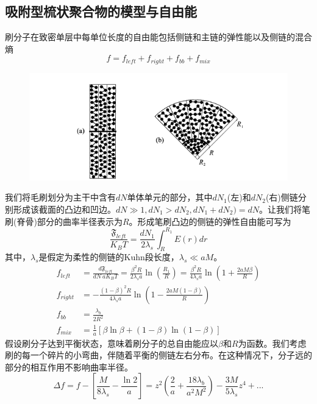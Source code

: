 \documentclass[12pt,a4paper]{article}
\numberwithin{equation}{section}
\begin{document}
\subsection{吸附型梳状聚合物的模型与自由能}
刷分子在致密单层中每单位长度的自由能包括侧链和主链的弹性能以及侧链的混合熵
\begin{equation}
f=f_{left}+f_{right}+f_{bb}+f_{mix}
\end{equation}
\begin{figure}[H]
\centering
\includegraphics[scale=0.7]{./figures/3.png}
\caption{}
\end{figure}
我们将毛刷划分为主干中含有$dN$单体单元的部分，其中$dN _1$(左)和$dN_2$(右)侧链分别形成该截面的凸边和凹边。$dN \gg 1,dN_1>dN_2,dN_1+dN_2)=dN$。让我们将笔刷(脊骨)部分的曲率半径表示为$R$。形成笔刷凸边的侧链的弹性自由能可写为
\begin{equation}
\frac{\mathfrak{F}_{left}}{K_BT}=\frac{dN_1}{2\lambda _s}\int _{R}^{R_1} E(r)dr
\end{equation}
其中，$\lambda _s$是假定为柔性的侧链的Kuhn段长度，$\lambda _s \ll aM$。
\begin{equation}
\begin{aligned}
f_{left} & =\frac{d\mathfrak{F}_{left}}{dN~aK_BT}=\frac{\beta ^2R}{2\lambda _sa}\ln \left( \frac{R_1}{R} \right)=\frac{\beta^2R}{4\lambda_sa}\ln\left( 1+\frac{2aM\beta}{R} \right)	\\
f_{right} & =-\frac{(1-\beta)^2R}{4\lambda_sa}\ln(1-\frac{2aM(1-\beta)}{R})\\
f_{bb} &=\frac{\lambda _b}{2R^2}\\
f_{mix} & =\frac{1}{a}\left[ \beta\ln\beta +(1-\beta)\ln(1-\beta) \right]
\end{aligned}
\end{equation}	
假设刷分子达到平衡状态，意味着刷分子的总自由能应以$\beta$和$R$为函数。我们考虑刷的每一个碎片的小弯曲，伴随着平衡的侧链左右分布。在这种情况下，分子远的部分的相互作用不影响曲率半径。
\begin{equation}
\Delta f=f-\left[ \frac{M}{8\lambda _s}-\frac{\ln 2}{a} \right]	=z^2\left( \frac{2}{a}+\frac{18\lambda _b}{a^2M^2} \right)-\frac{3M}{5\lambda _s}z^4+...
\end{equation}	
\end{document}
